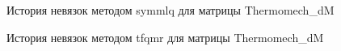 \begin{figure}[H]
    \renewcommand{\figurename}{Рисунок}
    \caption{История невязок методом symmlq для матрицы Thermomech_dM}
    \label{fig:image_31}
\end{figure}

\begin{figure}[H]
    \renewcommand{\figurename}{Рисунок}
    \caption{История невязок методом tfqmr для матрицы Thermomech_dM}
    \label{fig:image_32}
\end{figure}